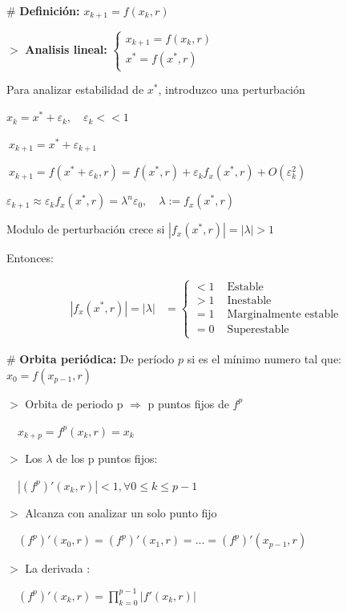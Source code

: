 \documentclass[%
 reprint,
 amsmath,amssymb,
 aps,
]{revtex4-1}
\begin{document}
\# \textbf{Definición: } $
x_{k+1} = f(x_k , r)
$

$>$ \textbf{Analisis lineal:}
$
\left\lbrace 
\begin{array}{l}
x_{k+1} = f(x_k , r) \\
x^{*} = f(x^{*}, r)
\end{array}
\right.
$

Para analizar estabilidad de $x^{*}$, introduzco una perturbación

$x_k = x^{*}+\varepsilon_k, \quad \varepsilon_k <<1 $

$\ x_{k+1} = {x}^{*} + \varepsilon_{k+1}$

$\ x_{k+1} = f\left(x^{*}+\varepsilon_{k}, r \right) 
= f\left(x^{*}, r\right)
+ \varepsilon_{k} f_{x}\left(x^{*}, r\right)
+ O\left(\varepsilon^{2}_{k}\right)$

$\varepsilon_{k+1} \approx \varepsilon_{k} f_{x}\left(x^{*}, r\right)
= \lambda^n \varepsilon_0, \quad \lambda := f_{x}\left(x^{*},r\right)$

Modulo de perturbación crece si $|f_{x}\left(x^{*},r\right)| = |\lambda| > 1$

Entonces:

$$
\begin{aligned}
|f_{x}\left(x^{*},r\right)| = |\lambda| &=\left\{\begin{array}{ll}
<1 & \text { Estable } \\
>1 & \text { Inestable } \\
=1 & \text { Marginalmente estable } \\
=0 & \text { Superestable }
\end{array}\right.
\end{aligned}
$$

\# \textbf{Orbita periódica:} De período $p$ si es el mínimo numero tal que: $
x_0 = f(x_{p-1},r)
$

$>$ Orbita de periodo p $\Rightarrow$ p puntos fijos de $f^p$ 

$\quad x_{k+p} = f^p(x_{k},r) = x_{k}$ 

$>$ Los $\lambda$ de los p puntos fijos:

$\quad | (f^p)'(x_k, r) | < 1, \forall 0 \leq k \leq p-1$

$>$ Alcanza con analizar un solo punto fijo

$\quad (f^p)'(x_0, r) =
(f^p)'(x_1, r) =
... =
(f^p)'(x_{p-1}, r)$

$>$ La derivada :

$\quad (f^p)'(x_k, r) = 
\prod_{k=0}^{p-1} 
|f ' (x_k, r)|
$
\end{document}
